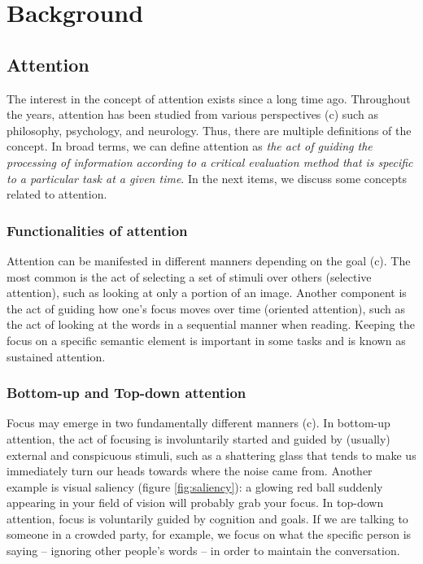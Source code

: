 \documentclass[English]{style/ic-tese-v3}
\begin{document}
\chapter{Background}
\section{Attention}
The interest in the concept of attention exists since a long time ago.
Throughout the years, attention has been studied
from various perspectives (c) such as philosophy, psychology, and neurology.
Thus, there are multiple definitions of the concept.
In broad terms, we can define attention as
\emph{the act of guiding the processing of information
according to a critical evaluation method that is specific to a particular task at a given time}.
In the next items, we discuss some concepts related to attention.

\subsection{Functionalities of attention}
Attention can be manifested in different manners depending on the goal (c).
The most common is the act of selecting a set of stimuli over others
(selective attention), such as looking at only a portion of an image.
Another component is the act of guiding how one's focus moves over time
(oriented attention), such as the act of looking at the words in
a sequential manner when reading.
Keeping the focus on a specific semantic element is important in some tasks
and is known as sustained attention.

\subsection{Bottom-up and Top-down attention}
Focus may emerge in two fundamentally different manners (c).
In bottom-up attention, the act of focusing is involuntarily
started and guided by (usually) external and conspicuous stimuli,
such as a shattering glass that tends to
make us immediately turn our heads towards where the noise came from.
Another example is visual saliency (figure \ref{fig:saliency}):
a glowing red ball suddenly appearing in
your field of vision will probably grab your focus.
In top-down attention, focus is voluntarily guided by cognition and goals.
If we are talking to someone in a crowded party, for example,
we focus on what the specific person is saying
-- ignoring other people's words -- in order to maintain the conversation.
\end{document}
